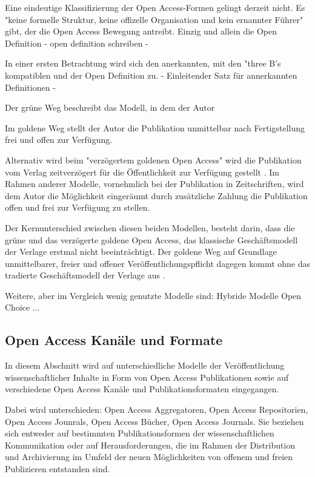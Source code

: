 Eine eindeutige Klassifizierung der Open Access-Formen gelingt derzeit nicht. Es "keine formelle Struktur, keine offizelle Organisation und kein ernannter Führer" gibt, der die Open Access Bewegung antreibt\cite{poynder_2011_suber}. Einzig und allein die Open Definition - open definition schreiben -

In einer ersten Betrachtung wird sich den anerkannten, mit den "three B's kompatiblen und der Open Definition zu. - Einleitender Satz für annerkannten Definitionen -

Der grüne Weg beschreibt das Modell, in dem der Autor

Im goldene Weg stellt der Autor die Publikation unmittelbar nach Fertigstellung frei und offen zur Verfügung. 

Alternativ wird beim "verzögertem goldenen Open Access" wird die Publikation vom Verlag zeitverzögert für die Öffentlichkeit zur Verfügung gestellt \cite{lewis_2012_inevitability}. Im Rahmen anderer Modelle, vornehmlich bei der Publikation in Zeitschriften, wird dem Autor die Möglichkeit eingeräumt durch zusätzliche Zahlung die Publikation offen und frei zur Verfügung zu stellen\cite{lewis_2012_inevitability}.

Der Kernunterschied zwischen diesen beiden Modellen, besteht darin, dass die grüne und das verzögerte goldene Open Access, das klassische Geschäftsmodell der Verlage erstmal nicht beeinträchtigt. Der goldene Weg auf Grundlage unmittelbarer, freier und offener Veröffentlichungspflicht dagegen kommt ohne das tradierte Geschäftsmodell der Verlage aus \cite{lewis_2012_inevitability}.

Weitere, aber im Vergleich wenig genutzte Modelle sind:
Hybride Modelle
Open Choice \cite{Hess_2006} 
...

\subsection{Open Access Kanäle und Formate}
In diesem Abschnitt wird auf unterschiedliche Modelle der Veröffentlichung wissenschaftlicher Inhalte in Form von Open Access Publikationen sowie auf verschiedene Open Access Kanäle und Publikationsformaten eingegangen.

Dabei wird unterschieden: Open Access Aggregatoren, Open Access Repositorien, Open Access Jounrals, Open Access Bücher, Open Access Journals. Sie beziehen sich entweder auf bestimmten Publikationsformen der wissenschaftlichen Kommunikation oder auf Herausforderungen, die im Rahmen der Distribution und Archivierung im Umfeld der neuen Möglichkeiten von offenem und freien Publizieren entstanden sind. 


